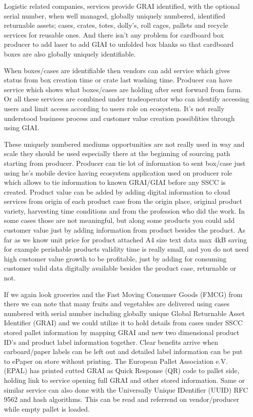 Logistic related companies, services provide GRAI\allowbreak\cite{GRAI}
identified, with the optional serial number, when well managed, globally
uniquely numbered, identified returnable assets; cases, crates, totes,
dolly's, roll cages, pallets and recycle services for reusable ones. And there
isn't any problem for cardboard box producer to add laser to add
GIAI\allowbreak\cite{GIAI}\allowbreak\cite{CajoMakeBright} to unfolded box
blanks so that cardboard boxes are also globally uniquely identifiable.

When boxes/cases are identifiable then vendors can add service which gives
status from box creation time or crate last washing time. Producer can have
service which shows what boxes/cases are holding after sent forward from farm.
Or all these services are combined under tradeoperator who can identify
accessing users and limit access according to users role on ecosystem. It's
not really understood business process and customer value creation
possiblities through using GIAI.

These uniquely numbered mediums opportunities are not really used in way and
scale they should be used especially there at the beginning of sourcing path
starting from producer. Producer can tie lot of information to sent box/case
just using he's mobile device having ecosystem application used on producer
role which allows to tie information to known GRAI/GIAI before any SSCC is
created. Product value can be added by adding digital information to cloud
services from origin of each product case from the origin place, original
product variety, harvesting time conditions and from the profession who did
the work. In some cases those are not meaningful, but along some products you
could add customer value just by adding information from product besides the
product. As far as we know unit price for product attached A4 size text data
max 4kB saving for example perishable products validity time is really small,
and you do not need high customer value growth to be profitable, just by
adding for consuming customer valid data digitally available besides the
product case, returnable or not.

If we again look groceries and the Fast Moving Consumer Goods (FMCG) from
there we can note that many fruits and vegetables are delivered using cases
numbered with serial number including globally unique Global Returnable Asset
Identifier (GRAI) and we could utilize it to hold details from cases under
SSCC stored pallet information by mapping GRAI and new two dimensional product
ID's and product label information together. Clear benefits arrive when
carboard/paper labels can be left out and detailed label information can be
put to ePaper on store without printing. The European Pallet Association e.V.
(EPAL) has printed cutted GRAI as Quick Response (QR) code to pallet side,
holding link to service opening full GRAI and other stored
information\allowbreak\cite{EPalQrPal}. Same or similar service can also done
with the Universally Unique IDentifier (UUID) RFC 9562\allowbreak\cite{rfc9562}
and hash algorithms\allowbreak\cite{CompHashFunc}\allowbreak\cite{PostQuantum}. This can be read and referrend on vendor/producer while empty pallet is loaded.

